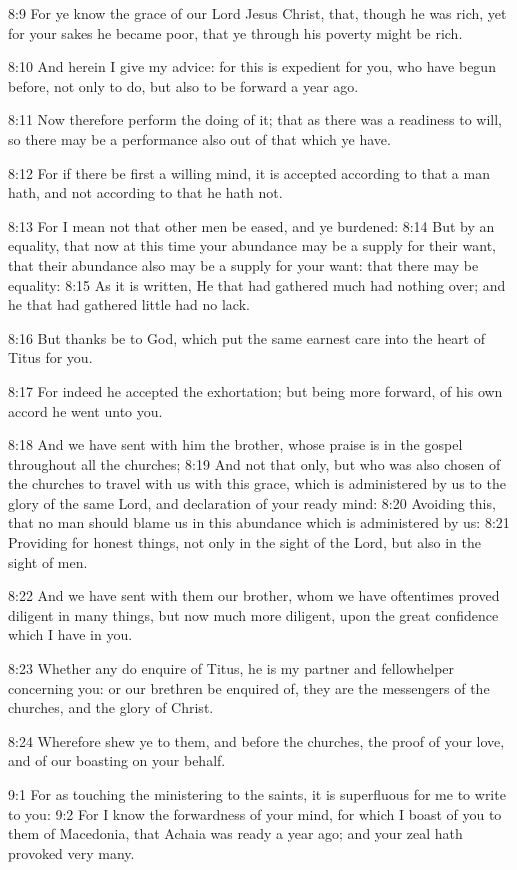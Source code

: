 8:9 For ye know the grace of our Lord Jesus Christ, that, though he was rich, yet for your sakes he became poor, that ye through his poverty might be rich.

8:10 And herein I give my advice: for this is expedient for you, who have begun before, not only to do, but also to be forward a year ago.

8:11 Now therefore perform the doing of it; that as there was a readiness to will, so there may be a performance also out of that which ye have.

8:12 For if there be first a willing mind, it is accepted according to that a man hath, and not according to that he hath not.

8:13 For I mean not that other men be eased, and ye burdened: 8:14 But by an equality, that now at this time your abundance may be a supply for their want, that their abundance also may be a supply for your want: that there may be equality: 8:15 As it is written, He that had gathered much had nothing over; and he that had gathered little had no lack.

8:16 But thanks be to God, which put the same earnest care into the heart of Titus for you.

8:17 For indeed he accepted the exhortation; but being more forward, of his own accord he went unto you.

8:18 And we have sent with him the brother, whose praise is in the gospel throughout all the churches; 8:19 And not that only, but who was also chosen of the churches to travel with us with this grace, which is administered by us to the glory of the same Lord, and declaration of your ready mind: 8:20 Avoiding this, that no man should blame us in this abundance which is administered by us: 8:21 Providing for honest things, not only in the sight of the Lord, but also in the sight of men.

8:22 And we have sent with them our brother, whom we have oftentimes proved diligent in many things, but now much more diligent, upon the great confidence which I have in you.

8:23 Whether any do enquire of Titus, he is my partner and fellowhelper concerning you: or our brethren be enquired of, they are the messengers of the churches, and the glory of Christ.

8:24 Wherefore shew ye to them, and before the churches, the proof of your love, and of our boasting on your behalf.

9:1 For as touching the ministering to the saints, it is superfluous for me to write to you: 9:2 For I know the forwardness of your mind, for which I boast of you to them of Macedonia, that Achaia was ready a year ago; and your zeal hath provoked very many.

